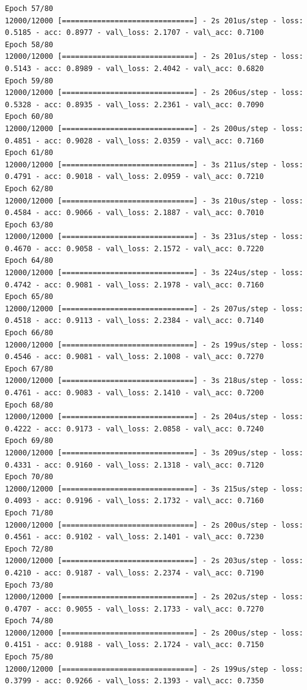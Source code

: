 \documentclass[11pt]{article}
\begin{document}
\begin{Verbatim}[commandchars=\\\{\}]
Epoch 57/80
12000/12000 [==============================] - 2s 201us/step - loss: 0.5185 - acc: 0.8977 - val\_loss: 2.1707 - val\_acc: 0.7100
Epoch 58/80
12000/12000 [==============================] - 2s 201us/step - loss: 0.5143 - acc: 0.8989 - val\_loss: 2.4042 - val\_acc: 0.6820
Epoch 59/80
12000/12000 [==============================] - 2s 206us/step - loss: 0.5328 - acc: 0.8935 - val\_loss: 2.2361 - val\_acc: 0.7090
Epoch 60/80
12000/12000 [==============================] - 2s 200us/step - loss: 0.4851 - acc: 0.9028 - val\_loss: 2.0359 - val\_acc: 0.7160
Epoch 61/80
12000/12000 [==============================] - 3s 211us/step - loss: 0.4791 - acc: 0.9018 - val\_loss: 2.0959 - val\_acc: 0.7210
Epoch 62/80
12000/12000 [==============================] - 3s 210us/step - loss: 0.4584 - acc: 0.9066 - val\_loss: 2.1887 - val\_acc: 0.7010
Epoch 63/80
12000/12000 [==============================] - 3s 231us/step - loss: 0.4670 - acc: 0.9058 - val\_loss: 2.1572 - val\_acc: 0.7220
Epoch 64/80
12000/12000 [==============================] - 3s 224us/step - loss: 0.4742 - acc: 0.9081 - val\_loss: 2.1978 - val\_acc: 0.7160
Epoch 65/80
12000/12000 [==============================] - 2s 207us/step - loss: 0.4518 - acc: 0.9113 - val\_loss: 2.2384 - val\_acc: 0.7140
Epoch 66/80
12000/12000 [==============================] - 2s 199us/step - loss: 0.4546 - acc: 0.9081 - val\_loss: 2.1008 - val\_acc: 0.7270
Epoch 67/80
12000/12000 [==============================] - 3s 218us/step - loss: 0.4761 - acc: 0.9083 - val\_loss: 2.1410 - val\_acc: 0.7200
Epoch 68/80
12000/12000 [==============================] - 2s 204us/step - loss: 0.4222 - acc: 0.9173 - val\_loss: 2.0858 - val\_acc: 0.7240
Epoch 69/80
12000/12000 [==============================] - 3s 209us/step - loss: 0.4331 - acc: 0.9160 - val\_loss: 2.1318 - val\_acc: 0.7120
Epoch 70/80
12000/12000 [==============================] - 3s 215us/step - loss: 0.4093 - acc: 0.9196 - val\_loss: 2.1732 - val\_acc: 0.7160
Epoch 71/80
12000/12000 [==============================] - 2s 200us/step - loss: 0.4561 - acc: 0.9102 - val\_loss: 2.1401 - val\_acc: 0.7230
Epoch 72/80
12000/12000 [==============================] - 2s 203us/step - loss: 0.4210 - acc: 0.9187 - val\_loss: 2.2374 - val\_acc: 0.7190
Epoch 73/80
12000/12000 [==============================] - 2s 202us/step - loss: 0.4707 - acc: 0.9055 - val\_loss: 2.1733 - val\_acc: 0.7270
Epoch 74/80
12000/12000 [==============================] - 2s 200us/step - loss: 0.4151 - acc: 0.9188 - val\_loss: 2.1724 - val\_acc: 0.7150
Epoch 75/80
12000/12000 [==============================] - 2s 199us/step - loss: 0.3799 - acc: 0.9266 - val\_loss: 2.1393 - val\_acc: 0.7350

\end{Verbatim}
\end{document}
